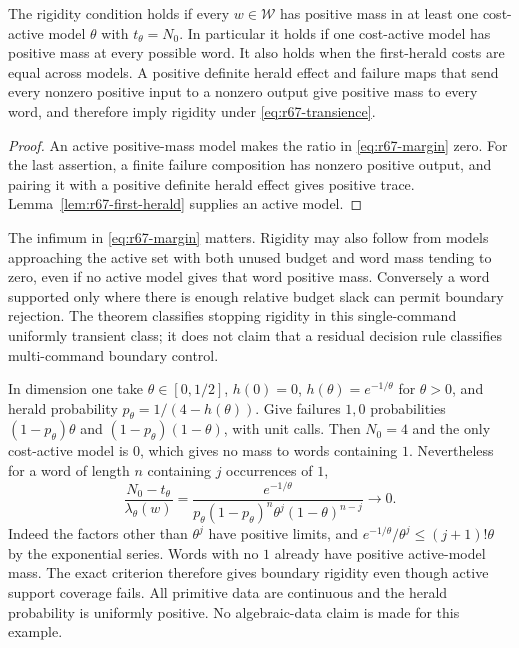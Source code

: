 \begin{corollary}\label{cor:r67-active-cover}
The rigidity condition holds if every $w\in\mathcal W$ has positive mass in at least one cost-active model $\theta$ with $t_\theta=N_0$. In particular it holds if one cost-active model has positive mass at every possible word. It also holds when the first-herald costs are equal across models. A positive definite herald effect and failure maps that send every nonzero positive input to a nonzero output give positive mass to every word, and therefore imply rigidity under \eqref{eq:r67-transience}.
\end{corollary}
\begin{proof}
An active positive-mass model makes the ratio in \eqref{eq:r67-margin} zero. For the last assertion, a finite failure composition has nonzero positive output, and pairing it with a positive definite herald effect gives positive trace. Lemma~\ref{lem:r67-first-herald} supplies an active model.
\end{proof}

The infimum in \eqref{eq:r67-margin} matters. Rigidity may also follow from models approaching the active set with both unused budget and word mass tending to zero, even if no active model gives that word positive mass. Conversely a word supported only where there is enough relative budget slack can permit boundary rejection. The theorem classifies stopping rigidity in this single-command uniformly transient class; it does not claim that a residual decision rule classifies multi-command boundary control.

\begin{example}\label{ex:r67-flat-margin}
In dimension one take $\theta\in[0,1/2]$, $h(0)=0$, $h(\theta)=e^{-1/\theta}$ for $\theta>0$, and herald probability $p_\theta=1/(4-h(\theta))$. Give failures $1,0$ probabilities $(1-p_\theta)\theta$ and $(1-p_\theta)(1-\theta)$, with unit calls. Then $N_0=4$ and the only cost-active model is $0$, which gives no mass to words containing $1$. Nevertheless for a word of length $n$ containing $j$ occurrences of $1$,
\[
 \frac{N_0-t_\theta}{\lambda_\theta(w)}=
 \frac{e^{-1/\theta}}{p_\theta(1-p_\theta)^n\theta^j(1-\theta)^{n-j}}
 \longrightarrow0.
\]
Indeed the factors other than $\theta^j$ have positive limits, and $e^{-1/\theta}/\theta^j\le(j+1)!\theta$ by the exponential series. Words with no $1$ already have positive active-model mass. The exact criterion therefore gives boundary rigidity even though active support coverage fails. All primitive data are continuous and the herald probability is uniformly positive. No algebraic-data claim is made for this example.
\end{example}

